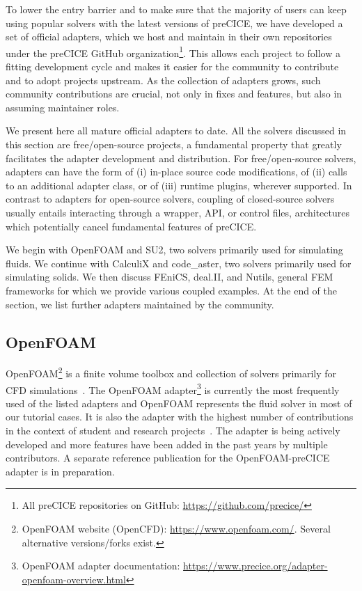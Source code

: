 To lower the entry barrier and to make sure that the majority of users can keep using popular solvers
with the latest versions of preCICE, we have developed a set of official adapters, which we host and maintain in their
own repositories under the preCICE GitHub organization\footnote{All preCICE repositories on GitHub: \url{https://github.com/precice/}}.
This allows each project to follow a fitting development cycle and makes it easier for the community to contribute and to adopt projects upstream.
As the collection of adapters grows, such community contributions
are crucial, not only in fixes and features, but also in assuming maintainer roles.

We present here all mature official adapters to date. All the solvers discussed in this section are free/open-source projects,
a fundamental property that greatly facilitates the adapter development and distribution.
For free/open-source solvers, adapters can have the form of (i) in-place source code modifications, of (ii) calls to an additional adapter class,
or of (iii) runtime plugins, wherever supported. In contrast to adapters for open-source solvers, coupling of closed-source solvers usually entails
interacting through a wrapper, API, or control files, architectures which potentially cancel fundamental features of preCICE.

We begin with OpenFOAM and SU2, two solvers primarily used for simulating fluids.
We continue with CalculiX and code\_aster, two solvers primarily used for simulating solids.
We then discuss FEniCS, deal.II, and Nutils, general FEM frameworks for which we provide various coupled examples.
At the end of the section, we list further adapters maintained by the community.
  
\subsection{OpenFOAM}

OpenFOAM\footnote{OpenFOAM website (OpenCFD): \url{https://www.openfoam.com/}. Several alternative versions/forks exist.} is a finite volume toolbox and collection of solvers primarily for CFD simulations~\cite{Weller1998_OpenFOAM}.
The OpenFOAM adapter\footnote{OpenFOAM adapter documentation: \url{https://www.precice.org/adapter-openfoam-overview.html}} is currently the most frequently used of the listed adapters and OpenFOAM represents the fluid solver in most of our tutorial cases.
It is also the adapter with the highest number of contributions in the context of student and research projects~\cite{CheungYau2016, Chourdakis2017, Risseeuw2019, Chourdakis2019_OFW14}.
The adapter is being actively developed and more features have been added in the past years by multiple contributors. A separate reference publication for the OpenFOAM-preCICE adapter is in preparation.

